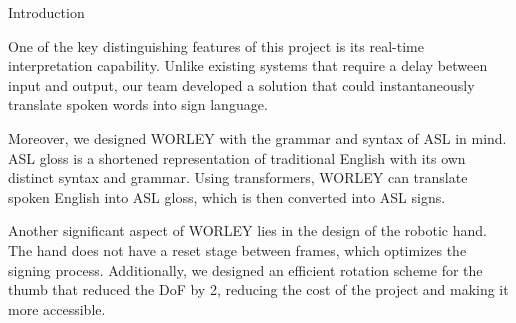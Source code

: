 \documentclass[final, 16pt]{beamer}
\newlength{\colwidth}
\begin{document}
\begin{frame}[t]
\begin{columns}[t]
\begin{column}{\colwidth}
  \begin{block}{Introduction}

    One of the key distinguishing features of this project is its real-time interpretation capability. Unlike existing systems that require a delay between input and output, our team developed a solution that could instantaneously translate spoken words into sign language. 

    Moreover, we designed WORLEY with the grammar and syntax of ASL in mind. ASL gloss is a shortened representation of traditional English with its own distinct syntax and grammar. Using transformers, WORLEY can translate spoken English into ASL gloss, which is then converted into ASL signs.

    Another significant aspect of WORLEY lies in the design of the robotic hand. The hand does not have a reset stage between frames, which optimizes the signing process. Additionally, we designed an efficient rotation scheme for the thumb that reduced the DoF by 2, reducing the cost of the project and making it more accessible. 


  \end{block}

\end{column}

\separatorcolumn


\end{columns}
\end{frame}
\end{document}
